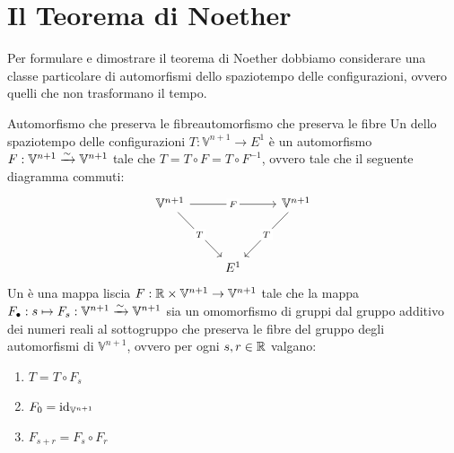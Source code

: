\documentclass[openany]{book}
\renewcommand\V{\mathbb{V}}
\begin{document}
\section{Il Teorema di Noether}

Per formulare e dimostrare il teorema di Noether dobbiamo considerare una classe particolare di automorfismi dello spaziotempo delle configurazioni, ovvero quelli che non trasformano il tempo.

\begin{definition}{Automorfismo che preserva le fibre}{automorfismo che preserva le fibre}
    Un  dello spaziotempo delle configurazioni $T:\V^{n+1}\to E^1$ è un automorfismo $F:\V^{n+1}\iso \V^{n+1}$ tale che $T = T \circ F = T \circ F^{-1}$, ovvero tale che il seguente diagramma commuti:
    \[\begin{tikzcd}
    	{\V^{n+1}} && {\V^{n+1}} \\
	    \\
	    & {E^1}
	    \arrow["F"{description}, from=1-1, to=1-3]
	    \arrow["T"{description}, from=1-1, to=3-2]
	    \arrow["T"{description}, from=1-3, to=3-2]
    \end{tikzcd}\]
    Un  è una mappa liscia $F:\R\times\V^{n+1}\to\V^{n+1}$ tale che la mappa $F_\bullet : s \mapsto F_s : \V^{n+1}\iso\V^{n+1}$ sia un omomorfismo di gruppi dal gruppo additivo dei numeri reali al sottogruppo che preserva le fibre del gruppo degli automorfismi di $\V^{n+1}$, ovvero per ogni $s,r \in \mathbb{R}$ valgano:\begin{enumerate}
        \item $T = T \circ F_s$
        \item $F_0 = \id_{\V^{n+1}} $
        \item $F_{s+r} = F_s\circ F_r$
    \end{enumerate}
\end{definition}
\end{document}
